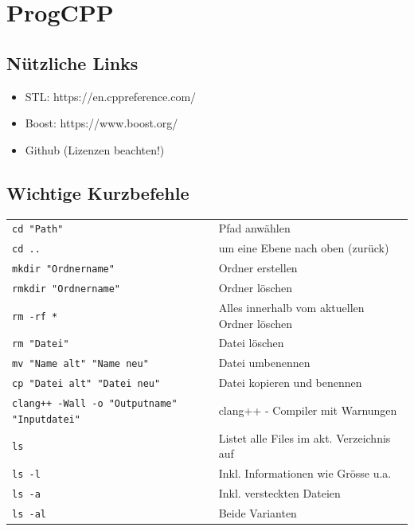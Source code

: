 \section{ProgCPP}

    \subsection{Nützliche Links}
        \begin{itemize}
            \item STL: https://en.cppreference.com/
            \item Boost: https://www.boost.org/
            \item Github (Lizenzen beachten!)
        \end{itemize}

    \subsection{Wichtige Kurzbefehle}
        \begin{tabular}{ll}
            \verb|cd "Path"| & Pfad anwählen \\
            \verb|cd ..| & um eine Ebene nach oben (zurück) \\
            \verb|mkdir "Ordnername"| & Ordner erstellen \\
            \verb|rmkdir "Ordnername"| & Ordner löschen \\
            \verb|rm -rf *| & Alles innerhalb vom aktuellen Ordner löschen \\
            \verb|rm "Datei"| & Datei löschen \\
            \verb|mv "Name alt" "Name neu"| & Datei umbenennen \\
            \verb|cp "Datei alt" "Datei neu"| & Datei kopieren und benennen \\
            \verb|clang++ -Wall -o "Outputname" "Inputdatei"| & clang++ - Compiler mit Warnungen \\
            \verb|ls| & Listet alle Files im akt. Verzeichnis auf \\
            \verb|ls -l| & Inkl. Informationen wie Grösse u.a. \\
            \verb|ls -a| & Inkl. versteckten Dateien \\
            \verb|ls -al| & Beide Varianten \\
        \end{tabular}

